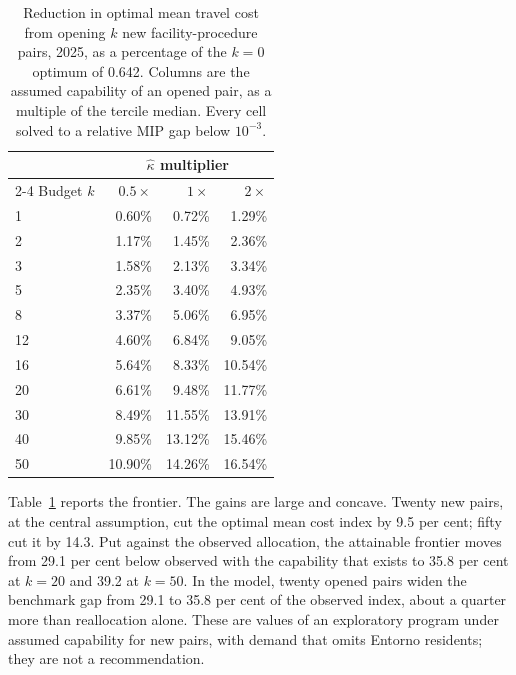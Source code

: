 \begin{table}[t]
\centering
\caption{Reduction in optimal mean travel cost from opening $k$ new
facility-procedure pairs, 2025, as a percentage of the $k=0$ optimum of 0.642.
Columns are the assumed capability of an opened pair, as a multiple of the
tercile median. Every cell solved to a relative MIP gap below $10^{-3}$.}
\label{tab:ksweep}
\begin{tabular}{lrrr}
\toprule
& \multicolumn{3}{c}{$\hat{\kappa}$ multiplier} \\
\cmidrule(lr){2-4}
Budget $k$ & $0.5\times$ & $1\times$ & $2\times$ \\
\midrule
1  & 0.60\%  & 0.72\%  & 1.29\%  \\
2  & 1.17\%  & 1.45\%  & 2.36\%  \\
3  & 1.58\%  & 2.13\%  & 3.34\%  \\
5  & 2.35\%  & 3.40\%  & 4.93\%  \\
8  & 3.37\%  & 5.06\%  & 6.95\%  \\
12 & 4.60\%  & 6.84\%  & 9.05\%  \\
16 & 5.64\%  & 8.33\%  & 10.54\% \\
20 & 6.61\%  & 9.48\%  & 11.77\% \\
30 & 8.49\%  & 11.55\% & 13.91\% \\
40 & 9.85\%  & 13.12\% & 15.46\% \\
50 & 10.90\% & 14.26\% & 16.54\% \\
\bottomrule
\end{tabular}
\end{table}

Table~\ref{tab:ksweep} reports the frontier. The gains are large and concave.
Twenty new pairs, at the central assumption, cut the optimal mean cost index by 9.5 per cent; fifty cut it by 14.3. Put against the observed allocation, the attainable
frontier moves from 29.1 per cent below observed with the capability that exists
to 35.8 per cent at $k=20$ and 39.2 at $k=50$. In the model, twenty opened pairs widen the benchmark gap from 29.1 to 35.8 per cent of the observed index, about a quarter more than reallocation alone. These are values of an exploratory program under assumed capability for new pairs, with demand that omits Entorno residents; they are not a recommendation.

